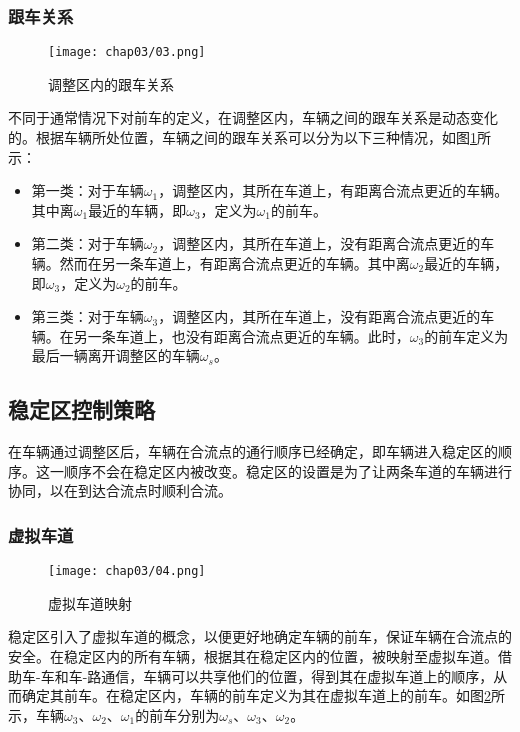 \subsubsection{跟车关系}
\begin{figure}[htbp]
    \centering
    \texttt{[image: chap03/03.png]}
    \caption{调整区内的跟车关系}
    \label{fig:follow_relation}
\end{figure}
不同于通常情况下对前车的定义，在调整区内，车辆之间的跟车关系是动态变化的。根据车辆所处位置，车辆之间的跟车关系可以分为以下三种情况，如图\ref{fig:follow_relation}所示：
\begin{itemize}
    \item 第一类：对于车辆$\omega_1$，调整区内，其所在车道上，有距离合流点更近的车辆。其中离$\omega_1$最近的车辆，即$\omega_3$，定义为$\omega_1$的前车。
    \item 第二类：对于车辆$\omega_2$，调整区内，其所在车道上，没有距离合流点更近的车辆。然而在另一条车道上，有距离合流点更近的车辆。其中离$\omega_2$最近的车辆，即$\omega_3$，定义为$\omega_2$的前车。
    \item 第三类：对于车辆$\omega_3$，调整区内，其所在车道上，没有距离合流点更近的车辆。在另一条车道上，也没有距离合流点更近的车辆。此时，$\omega_3$的前车定义为最后一辆离开调整区的车辆$\omega_s$。
\end{itemize}

\subsection{稳定区控制策略}
在车辆通过调整区后，车辆在合流点的通行顺序已经确定，即车辆进入稳定区的顺序。这一顺序不会在稳定区内被改变。稳定区的设置是为了让两条车道的车辆进行协同，以在到达合流点时顺利合流。

\subsubsection{虚拟车道}
\begin{figure}[htbp]
    \centering
    \texttt{[image: chap03/04.png]}
    \caption{虚拟车道映射}
    \label{fig:virtual_lane}
\end{figure}
稳定区引入了虚拟车道的概念，以便更好地确定车辆的前车，保证车辆在合流点的安全。在稳定区内的所有车辆，根据其在稳定区内的位置，被映射至虚拟车道。借助车-车和车-路通信，车辆可以共享他们的位置，得到其在虚拟车道上的顺序，从而确定其前车。在稳定区内，车辆的前车定义为其在虚拟车道上的前车。如图\ref{fig:virtual_lane}所示，车辆$\omega_3$、$\omega_2$、$\omega_1$的前车分别为$\omega_s$、$\omega_3$、$\omega_2$。



